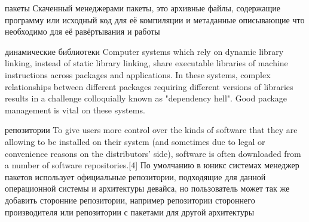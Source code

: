 пакеты
Скаченный менеджерами пакеты, это архивные файлы, содержащие программу или исходный код для её компиляции и метаданные описывающие что необходимо для её равёртывания и работы 

динамические библиотеки
Computer systems which rely on dynamic library linking, instead of static library linking, share executable libraries of machine instructions across packages and applications. In these systems, complex relationships between different packages requiring different versions of libraries results in a challenge colloquially known as "dependency hell".  Good package management is vital on these systems.

репозитории 
To give users more control over the kinds of software that they are allowing to be installed on their system (and sometimes due to legal or convenience reasons on the distributors' side), software is often downloaded from a number of software repositories.[4]
По умолчанию в юникс системах менеджер пакетов использует официальные репозитории, подходящие для данной операционной системы и архитектуры девайса, но пользователь может так же добавить сторонние репозитории, например репозитории стороннего производителя или репозитории с пакетами для другой архитектуры
\fi


